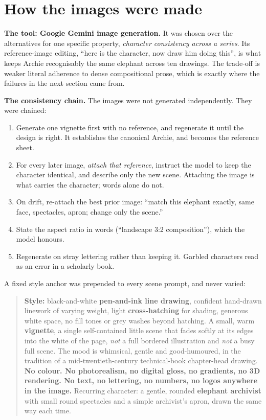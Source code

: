 \section{How the images were made}

\textbf{The tool: Google Gemini image generation.} It was chosen over the alternatives for one
specific property, \emph{character consistency across a series}. Its reference-image editing,
\enquote{here is the character, now draw him doing this}, is what keeps Archie recognisably the
same elephant across ten drawings. The trade-off is weaker literal adherence to dense
compositional prose, which is exactly where the failures in the next section came from.

\textbf{The consistency chain.} The images were not generated independently. They were chained:

\begin{enumerate}[leftmargin=1.4em,itemsep=2pt,topsep=3pt]
  \item Generate one vignette first with no reference, and regenerate it until the design is
    right. It establishes the canonical Archie, and becomes the reference sheet.
  \item For every later image, \emph{attach that reference}, instruct the model to keep the
    character identical, and describe only the new scene. Attaching the image is what carries
    the character; words alone do not.
  \item On drift, re-attach the best prior image: \enquote{match this elephant exactly, same
    face, spectacles, apron; change only the scene.}
  \item State the aspect ratio in words (\enquote{landscape 3:2 composition}), which the model
    honours.
  \item Regenerate on stray lettering rather than keeping it. Garbled characters read as an
    error in a scholarly book.
\end{enumerate}

\noindent A fixed style anchor was prepended to every scene prompt, and never varied:

\begin{quote}\small
\textbf{Style:} black-and-white \textbf{pen-and-ink line drawing}, confident hand-drawn linework
of varying weight, light \textbf{cross-hatching} for shading, generous white space, no fill tones
or grey washes beyond hatching. A small, warm \textbf{vignette}, a single self-contained little
scene that fades softly at its edges into the white of the page, \emph{not} a full bordered
illustration and \emph{not} a busy full scene. The mood is whimsical, gentle and good-humoured,
in the tradition of a mid-twentieth-century technical-book chapter-head drawing.
\textbf{No colour. No photorealism, no digital gloss, no gradients, no 3D rendering. No text, no
lettering, no numbers, no logos anywhere in the image.} Recurring character: a gentle, rounded
\textbf{elephant archivist} with small round spectacles and a simple archivist's apron, drawn the
same way each time.
\end{quote}


